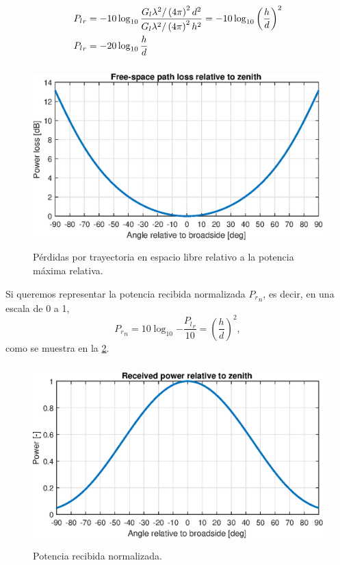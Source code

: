 \documentclass{article}
\newenvironment{standalone}{\begin{preview}}{\end{preview}}
\begin{document}
\begin{standalone}
  \begin{align}
    {P_l}_r &= -10 \log_{10}{ \frac{ G_l \lambda^2 / \left( 4\pi \right)^2 d^2 }{ G_l \lambda^2 / \left( 4\pi \right)^2 h^2 }} = - 10 \log_{10}{ \left( \frac{h}{d} \right)^2} \nonumber \\
    {P_l}_r &= -20 \log_{10}{\frac{h}{d}}
    \tagaddtext{[\si{\decibel}]}
  \end{align}

  \begin{figure}[!htbp]
    \centering
    \includegraphics[width=\linewidth, height=70mm, keepaspectratio]{../images/free-space-path-loss.eps}
    \caption{Pérdidas por trayectoria en espacio libre relativo a la potencia máxima relativa.}
    \label{fig:free-space-path-loss}
  \end{figure}

  Si queremos representar la potencia recibida normalizada ${P_r}_n$, es decir, en una escala de 0 a 1,
  \begin{equation}
    {P_r}_n = 10 \log_{10}{ -\frac{{P_l}_r}{10} } = \left( \frac{h}{d} \right)^2,
  \end{equation}
  como se muestra en la \cref{fig:received-power}.

  \begin{figure}[!htbp]
    \centering
    \includegraphics[width=\linewidth, height=70mm, keepaspectratio]{../images/received-power.eps}
    \caption{Potencia recibida normalizada.}
    \label{fig:received-power}
  \end{figure}


\end{standalone}
\end{document}
